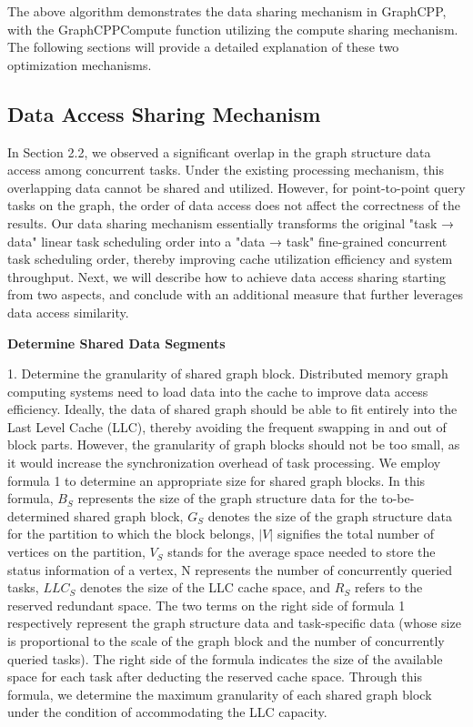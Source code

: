 \documentclass[lettersize,journal]{IEEEtran} %
\begin{document}
The above algorithm demonstrates the data sharing mechanism in GraphCPP, with the GraphCPPCompute function utilizing the compute sharing mechanism. The following sections will provide a detailed explanation of these two optimization mechanisms.

\subsection{Data Access Sharing Mechanism}
In Section 2.2, we observed a significant overlap in the graph structure data access among concurrent tasks. Under the existing processing mechanism, this overlapping data cannot be shared and utilized. However, for point-to-point query tasks on the graph, the order of data access does not affect the correctness of the results. Our data sharing mechanism essentially transforms the original "task → data" linear task scheduling order into a "data → task" fine-grained concurrent task scheduling order, thereby improving cache utilization efficiency and system throughput. Next, we will describe how to achieve data access sharing starting from two aspects, and conclude with an additional measure that further leverages data access similarity.

{\bf{Determine Shared Data Segments}}

1. Determine the granularity of shared graph block. Distributed memory graph computing systems need to load data into the cache to improve data access efficiency. Ideally, the data of shared graph should be able to fit entirely into the Last Level Cache (LLC), thereby avoiding the frequent swapping in and out of block parts. However, the granularity of graph blocks should not be too small, as it would increase the synchronization overhead of task processing. We employ formula 1 to determine an appropriate size for shared graph blocks. In this formula, $B_S$ represents the size of the graph structure data for the to-be-determined shared graph block, $G_S$ denotes the size of the graph structure data for the partition to which the block belongs, $|V|$ signifies the total number of vertices on the partition, $V_S$ stands for the average space needed to store the status information of a vertex, N represents the number of concurrently queried tasks, $LLC_S$ denotes the size of the LLC cache space, and $R_S$ refers to the reserved redundant space. The two terms on the right side of formula 1 respectively represent the graph structure data and task-specific data (whose size is proportional to the scale of the graph block and the number of concurrently queried tasks). The right side of the formula indicates the size of the available space for each task after deducting the reserved cache space. Through this formula, we determine the maximum granularity of each shared graph block under the condition of accommodating the LLC capacity.
\end{document}

